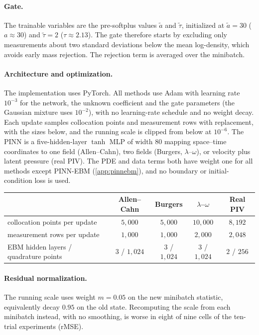 \documentclass[twoside]{article}
\begin{document}
\paragraph{Gate.}
The trainable variables are the pre-softplus values $\tilde a$ and $\tilde\tau$,
initialized at $\tilde a = 30$ ($a \approx 30$) and $\tilde\tau = 2$
($\tau \approx 2.13$). The gate therefore starts by excluding only measurements
about two standard deviations below the mean log-density, which avoids early
mass rejection. The rejection term is averaged over the minibatch.

\paragraph{Architecture and optimization.}
The implementation uses PyTorch. All methods use Adam with learning rate
$10^{-3}$ for the network, the unknown coefficient and the gate parameters (the
Gaussian mixture uses $10^{-2}$), with no learning-rate schedule and no weight
decay. Each update samples collocation points and measurement rows with
replacement, with the sizes below, and the running scale is clipped from below
at $10^{-6}$. The PINN is a five-hidden-layer
$\tanh$ MLP of width $80$ mapping space--time coordinates to one field (Allen--Cahn), two
fields (Burgers, $\lambda$--$\omega$), or velocity plus latent pressure (real
PIV). The PDE and data terms both have weight one for all methods except PINN-EBM
(\cref{app:pinnebm}), and no boundary or initial-condition loss is used.

\begin{center}\small
\setlength{\tabcolsep}{6pt}
\begin{tabular}{lcccc}
\toprule
 & Allen--Cahn & Burgers & $\lambda$--$\omega$ & Real PIV \\
\midrule
collocation points per update & $5{,}000$ & $5{,}000$ & $10{,}000$ & $8{,}192$ \\
measurement rows per update    & $1{,}000$ & $1{,}000$ & $2{,}000$ & $2{,}048$ \\
EBM hidden layers / quadrature points & $3$ / $1{,}024$ & $3$ / $1{,}024$ & $3$ / $1{,}024$ & $2$ / $256$ \\
\bottomrule
\end{tabular}
\end{center}

\paragraph{Residual normalization.}
The running scale uses weight $m = 0.05$ on the new minibatch statistic,
equivalently decay $0.95$ on the old state. Recomputing the scale from each
minibatch instead, with no smoothing, is worse in eight of nine cells of the
ten-trial experiments (rMSE).
\end{document}
